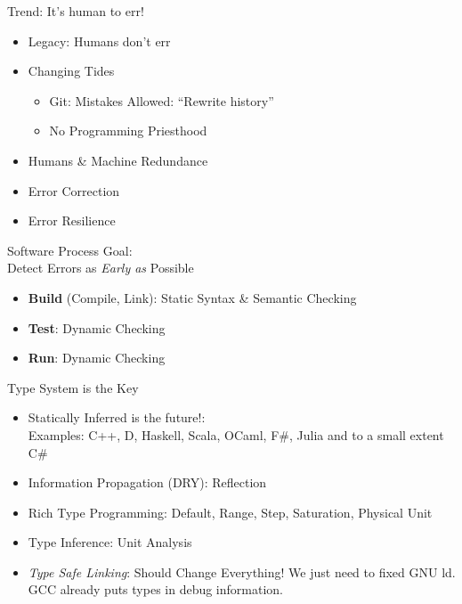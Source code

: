 \documentclass[xcolor=dvipsnames]{beamer}
\begin{document}
\begin{frame}[fragile]{Trend: It's human to err!}
  \begin{figure}
  \end{figure}
  \begin{itemize}[<+->]
  \item Legacy: Humans don't err
  \item Changing Tides
    \begin{itemize}[<+->]
    \item Git: Mistakes Allowed: ``Rewrite history''
    \item No Programming Priesthood
    \end{itemize}
  \item Humans \& Machine Redundance
  \item Error Correction
  \item Error Resilience
  \end{itemize}
\end{frame}

\begin{frame}[fragile]{Software Process Goal:\\Detect Errors as \emph{Early as} Possible}
  \begin{itemize}[<+->]
  \item \textbf{Build} (Compile, Link): Static Syntax \& Semantic Checking
  \item \textbf{Test}: Dynamic Checking
  \item \textbf{Run}: Dynamic Checking
  \end{itemize}
\end{frame}

\begin{frame}[fragile]{Type System is the Key}
  \begin{itemize}[<+->]
  \item Statically Inferred is the future!:\\
    Examples: C++, D, Haskell, Scala, OCaml, F\#, Julia and to a small extent
    C\#
  \item Information Propagation (DRY): Reflection
  \item Rich Type Programming: Default, Range, Step, Saturation, Physical Unit
  \item Type Inference: Unit Analysis
  \item \emph{Type Safe Linking}: Should Change Everything! We just need to
    fixed GNU ld. GCC already puts types in debug information.
  \end{itemize}
\end{frame}
\end{document}

